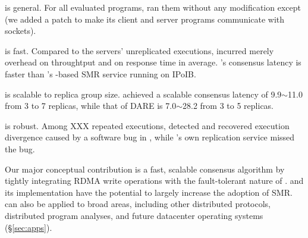 \begin{tightenum}
\item \xxx is general. For all evaluated programs, \xxx ran them without any 
modification except \calvin (we added a \nlinescalvin patch to make its client 
and server programs communicate with sockets).

\item \xxx is fast. Compared to the \nprog servers' unreplicated executions, 
\xxx incurred merely \tputoverhead overhead on throughtput and \latencyoverhead 
on response time in average. \xxx's consensus latency is \fasterthanzookeeper 
faster than \calvin's \zookeeper-based SMR service running on IPoIB.

\item \xxx is scalable to replica group size. \xxx achieved a scalable 
consensus latency of 9.9$\sim$11.0 \us from 3 to 7 replicas, while that 
of DARE is 7.0$\sim$28.2 \us from 3 to 5 replicas.

\item \xxx is robust. Among XXX repeated executions, \xxx detected and 
recovered execution divergence caused by a software bug in \redis, while 
\redis's own replication service missed the bug.


\end{tightenum}  

Our major conceptual contribution is a fast, scalable \paxos consensus 
algorithm by tightly integrating RDMA write operations with the fault-tolerant 
nature of \paxos. \xxx and its implementation have the potential to largely 
increase the adoption of SMR. \xxx can also be applied to broad areas, 
including other distributed protocols, distributed program analyses, and 
future datacenter operating systems (\S\ref{sec:apps}). 

